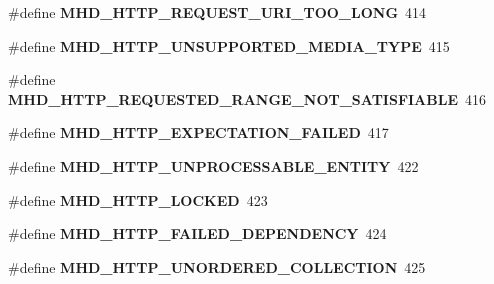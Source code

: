 \begin{DoxyCompactItemize}
\item 
\hypertarget{group__httpcode_ga9640093d1083726a3544ea942adf41ec}{\#define {\bfseries \-M\-H\-D\-\_\-\-H\-T\-T\-P\-\_\-\-R\-E\-Q\-U\-E\-S\-T\-\_\-\-U\-R\-I\-\_\-\-T\-O\-O\-\_\-\-L\-O\-N\-G}~414}\label{group__httpcode_ga9640093d1083726a3544ea942adf41ec}

\item 
\hypertarget{group__httpcode_ga1fa8cb2337aba35420e873bc67702153}{\#define {\bfseries \-M\-H\-D\-\_\-\-H\-T\-T\-P\-\_\-\-U\-N\-S\-U\-P\-P\-O\-R\-T\-E\-D\-\_\-\-M\-E\-D\-I\-A\-\_\-\-T\-Y\-P\-E}~415}\label{group__httpcode_ga1fa8cb2337aba35420e873bc67702153}

\item 
\hypertarget{group__httpcode_ga69833753f0bc3d9cc797bdcf9d1bc867}{\#define {\bfseries \-M\-H\-D\-\_\-\-H\-T\-T\-P\-\_\-\-R\-E\-Q\-U\-E\-S\-T\-E\-D\-\_\-\-R\-A\-N\-G\-E\-\_\-\-N\-O\-T\-\_\-\-S\-A\-T\-I\-S\-F\-I\-A\-B\-L\-E}~416}\label{group__httpcode_ga69833753f0bc3d9cc797bdcf9d1bc867}

\item 
\hypertarget{group__httpcode_ga09b4559d0bcb0d6cf1393228204a6976}{\#define {\bfseries \-M\-H\-D\-\_\-\-H\-T\-T\-P\-\_\-\-E\-X\-P\-E\-C\-T\-A\-T\-I\-O\-N\-\_\-\-F\-A\-I\-L\-E\-D}~417}\label{group__httpcode_ga09b4559d0bcb0d6cf1393228204a6976}

\item 
\hypertarget{group__httpcode_ga647b94383b6416a810663935375efe61}{\#define {\bfseries \-M\-H\-D\-\_\-\-H\-T\-T\-P\-\_\-\-U\-N\-P\-R\-O\-C\-E\-S\-S\-A\-B\-L\-E\-\_\-\-E\-N\-T\-I\-T\-Y}~422}\label{group__httpcode_ga647b94383b6416a810663935375efe61}

\item 
\hypertarget{group__httpcode_ga701850725b069d4501ad587cab137e3e}{\#define {\bfseries \-M\-H\-D\-\_\-\-H\-T\-T\-P\-\_\-\-L\-O\-C\-K\-E\-D}~423}\label{group__httpcode_ga701850725b069d4501ad587cab137e3e}

\item 
\hypertarget{group__httpcode_ga1a9fa8d2b8b77cb9aeca3e02bca5c7d1}{\#define {\bfseries \-M\-H\-D\-\_\-\-H\-T\-T\-P\-\_\-\-F\-A\-I\-L\-E\-D\-\_\-\-D\-E\-P\-E\-N\-D\-E\-N\-C\-Y}~424}\label{group__httpcode_ga1a9fa8d2b8b77cb9aeca3e02bca5c7d1}

\item 
\hypertarget{group__httpcode_gac4cb98c57126faf15f1202c678ba842c}{\#define {\bfseries \-M\-H\-D\-\_\-\-H\-T\-T\-P\-\_\-\-U\-N\-O\-R\-D\-E\-R\-E\-D\-\_\-\-C\-O\-L\-L\-E\-C\-T\-I\-O\-N}~425}\label{group__httpcode_gac4cb98c57126faf15f1202c678ba842c}


\end{DoxyCompactItemize}
